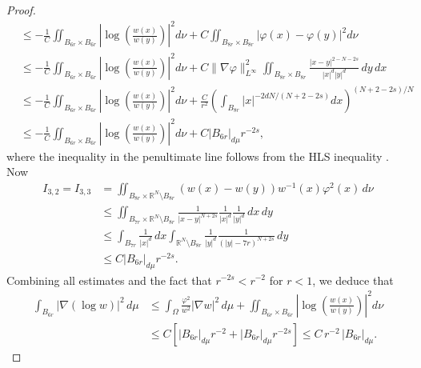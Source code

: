\documentclass[11pt]{article}
\newcommand{\om} {\Omega}
\newcommand{\lv}{\lVert}
\newcommand{\rv}{\rVert}
\newcommand{\grad}{\nabla}
\begin{document}
\begin{proof}
\begin{align*}
    & \leq -\frac{1}{C} \iint_{B_{6r} \times B_{6r}} \left| \log \left(\frac{w(x)}{w(y)}\right) \right|^2 d\nu + C \iint_{B_{8r} \times B_{8r}} \left| \varphi(x) - \varphi(y) \right|^2 d\nu \\
    & \leq -\frac{1}{C} \iint_{B_{6r} \times B_{6r}} \left| \log \left(\frac{w(x)}{w(y)}\right) \right|^2 d\nu + C \lv \grad \varphi \rv_{L^{\infty}}^2 \iint_{B_{8r} \times B_{8r}} \frac{|x-y|^{2-N-2s}}{|x|^{d}|y|^{d}} \, dy \, dx \\
    & \leq -\frac{1}{C} \iint_{B_{6r} \times B_{6r}} \left| \log \left(\frac{w(x)}{w(y)}\right) \right|^2 d\nu + \frac{C}{r^2} \left( \int_{B_{8r}} |x|^{-2d N/(N+2-2s)}dx\right)^{(N+2-2s)/N} \\
    & \leq -\frac{1}{C} \iint_{B_{6r} \times B_{6r}} \left| \log \left(\frac{w(x)}{w(y)}\right) \right|^2 d\nu  +  C |B_{6r}|_{d\mu} r^{-2s},
\end{align*}
where the inequality in the penultimate line follows from the HLS inequality \cite{liebloss2001analysis}. Now
\begin{align*}
I_{3,2} = I_{3,3} &= \iint_{ B_{8r} \times \mathbb{R}^N \setminus B_{8r} } (w(x) - w(y)) w^{-1}(x) \varphi^2(x) \, d\nu \\
& \leq \iint_{B_{7r} \times \mathbb{R}^N \setminus B_{8r}} \frac{1}{|x - y|^{N + 2s}} \frac{1}{|x|^{d}}  \frac{1}{|y|^{d}} \, dx \, dy \\
&\leq \int_{B_{7r}} \frac{1}{|x|^{d}} \, dx \int_{\mathbb{R}^N \setminus B_{8r}} \frac{1}{|y|^{d}}  \frac{1}{( |y|-7r)^{N + 2s}} \, dy\\
& \leq C |B_{6r}|_{d\mu} r^{-2s}.
\end{align*}
Combining all estimates and the fact that \( r^{-2s} < r^{-2} \) for $r < 1$, we deduce that
\begin{align*}
\int_{B_{6r}} |\nabla(\log w)|^2 \, d\mu  &\leq \int_{\Omega}  \frac{\varphi^2}{w^2} |\nabla w|^2 \, d\mu +  \iint_{B_{6r} \times B_{6r}} \left| \log \left( \frac{w(x)}{w(y)} \right) \right|^2 d\nu \\
&\leq C \left[ |B_{6r}|_{d\mu} r^{-2} +  |B_{6r}|_{d\mu} r^{-2s} \right] \leq C \, r^{-2} \, |B_{6r}|_{d\mu}.

\end{align*}
\end{proof}
\end{document}
